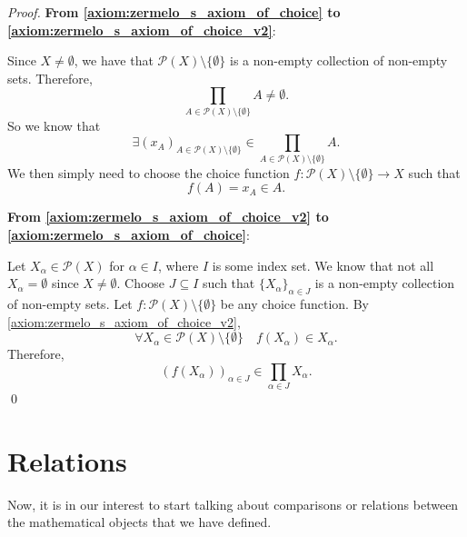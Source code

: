 \documentclass[notoc,notitlepage]{tufte-book}
\begin{document}
\begin{proof}
  \textbf{From \cref{axiom:zermelo_s_axiom_of_choice} to \cref{axiom:zermelo_s_axiom_of_choice_v2}}:

  Since $X \neq \emptyset$, we have that $\mathcal{P}(X) \setminus \{ \emptyset \}$ is a non-empty collection of non-empty sets. Therefore,
  \begin{equation*}
    \prod_{A \in \mathcal{P}(X) \setminus \{ \emptyset \} } A \neq \emptyset.
  \end{equation*}
  So we know that
  \begin{equation*}
    \exists ( x_A )_{A \in \mathcal{P}(X) \setminus \{ \emptyset \} } \in \prod_{A \in \mathcal{P}(X) \setminus \{ \emptyset \} } A.
  \end{equation*}
  We then simply need to choose the choice function $f : \mathcal{P}(X) \setminus \{ \emptyset \} \to X$ such that
  \begin{equation*}
    f(A) = x_A \in A.
  \end{equation*}

  \noindent\textbf{From \cref{axiom:zermelo_s_axiom_of_choice_v2} to \cref{axiom:zermelo_s_axiom_of_choice}}: 

  Let $X_\alpha \in \mathcal{P}(X)$ for $\alpha \in I$, where $I$ is some index set. We know that not all $X_\alpha = \emptyset$ since $X \neq \emptyset$. Choose $J \subseteq I$ such that $\{ X_\alpha \}_{\alpha \in J}$ is a non-empty collection of non-empty sets. Let $f: \mathcal{P}(X) \setminus \{ \emptyset \}$ be any choice function. By \cref{axiom:zermelo_s_axiom_of_choice_v2}, 
  \begin{equation*}
    \forall X_\alpha \in \mathcal{P}(X) \setminus \{ \emptyset \} \quad f(X_\alpha) \in X_\alpha.
  \end{equation*}
  Therefore,
  \begin{equation*}
    ( f(X_\alpha) )_{\alpha \in J} \in \prod_{\alpha \in J} X_\alpha.
  \end{equation*}\qed
\end{proof}


\section{Relations}%
\label{sec:relations}

Now, it is in our interest to start talking about comparisons or relations between the mathematical objects that we have defined.
\end{document}
